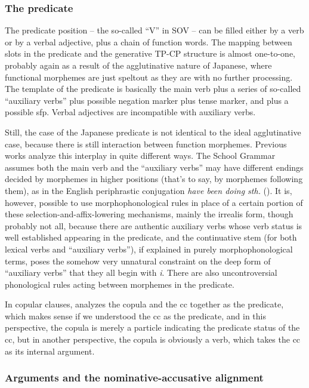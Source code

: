 \documentclass[UTF8, a4paper, oneside, scheme=plain]{ctexart}
\newcommand{\corpus}[1]{\emph{#1}}
\begin{document}
\subsubsection{The predicate}\label{sec:predicate-abs}

The predicate position -- the so-called ``V'' in SOV -- 
can be filled either by a verb or by a verbal adjective,
plus a chain of function words.
The mapping between slots in the predicate and the generative TP-CP structure is almost one-to-one,
probably again as a result of the agglutinative nature of Japanese,
where functional morphemes are just speltout as they are with no further processing.
The template of the predicate is basically
the main verb plus a series of so-called ``auxiliary verbs'' 
plus possible negation marker plus tense marker,
and plus a possible \ac{sfp}. 
Verbal adjectives are incompatible with auxiliary verbs.

Still, the case of the Japanese predicate is not identical to the ideal agglutinative case,
because there is still interaction between function morphemes.
Previous works analyze this interplay in quite different ways.
The School Grammar assumes both the main verb and the ``auxiliary verbs'' may have different endings 
decided by morphemes in higher positions (that's to say, by morphemes following them),
as in the English periphrastic conjugation \corpus{have been doing sth.}
().
It is, however, possible to use morphophonological rules 
in place of a certain portion of these selection-and-affix-lowering mechanisms,
mainly the irrealis form,
though probably not all,
because there are authentic auxiliary verbs whose verb status is well established 
appearing in the predicate,
and the continuative stem (for both lexical verbs and ``auxiliary verbs''),
if explained in purely morphophonological terms,
poses the somehow very unnatural constraint on the deep form of ``auxiliary verbs''
that they all begin with \corpus{i}.
There are also uncontroversial phonological rules acting between morphemes in the predicate.

In copular clauses,
\citet{tsutsui1989dictionary} analyzes the copula and the \acs{cc} together as the predicate,
which makes sense if we understood the \acs{cc} as the predicate,
and in this perspective, the copula is merely a particle indicating the predicate status of the \acs{cc},
but in another perspective, the copula is obviously a verb,
which takes the \acs{cc} as its internal argument.

\subsubsection{Arguments and the nominative-accusative alignment}\label{sec:alignment}
\end{document}
